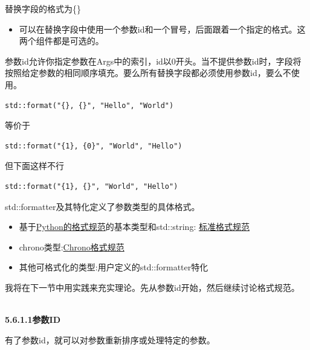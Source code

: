 替换字段的格式为\{\}

\begin{itemize}
\item 
可以在替换字段中使用一个参数id和一个冒号，后面跟着一个指定的格式。这两个组件都是可选的。
\end{itemize}

参数id允许你指定参数在Args中的索引，id以0开头。当不提供参数id时，字段将按照给定参数的相同顺序填充。要么所有替换字段都必须使用参数id，要么不使用。

\begin{lstlisting}[style=styleCXX]
std::format("{}, {}", "Hello", "World") 
\end{lstlisting}

等价于

\begin{lstlisting}[style=styleCXX]
std::format("{1}, {0}", "World", "Hello")
\end{lstlisting}

但下面这样不行

\begin{lstlisting}[style=styleCXX]
std::format("{1}, {}", "World", "Hello") 
\end{lstlisting}

std::formatter及其特化定义了参数类型的具体格式。

\begin{itemize}
\item 
基于\href{ttps://docs.python.org/3/library/stdtypes.html#str.format}{Python的格式规范}的基本类型和std::string: \href{https://en.cppreference.com/w/cpp/utility/format/formatter#Standard_format_specification}{标准格式规范}

\item 
chrono类型:\href{ttps://en.cppreference.com/w/cpp/chrono/system_clock/formatter#Format_specification}{Chrono格式规范}

\item 
其他可格式化的类型:用户定义的std::formatter特化
\end{itemize}

我将在下一节中用实践来充实理论。先从参数id开始，然后继续讨论格式规范。

\hspace*{\fill} \\ %
\noindent
\textbf{5.6.1.1\hspace{0.2cm}参数ID}

有了参数id，就可以对参数重新排序或处理特定的参数。

